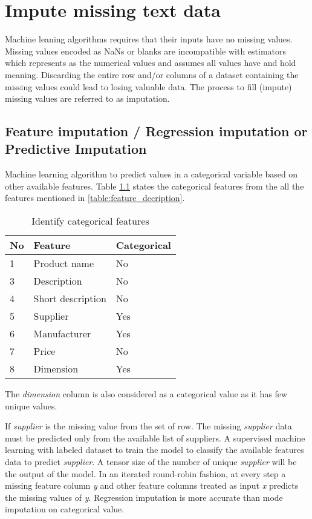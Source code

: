 \chapter{Impute missing text data}

Machine leaning algorithms requires that their inputs have no missing values.
Missing values encoded as NaNs or blanks are incompatible with estimators which represents as the numerical values and assumes all values have and hold meaning. Discarding the entire row and/or columns of a dataset containing the missing values could lead to losing valuable data. The process to fill (impute) missing values are referred to as imputation.

\section{Feature imputation / Regression imputation or \\ Predictive Imputation}

Machine learning algorithm to predict values in a categorical variable based on other available features. Table \ref{table:feature_imputation} states the categorical features from the all the features mentioned in \ref{table:feature_decription}.


\begin{table}[h]
    \centering
    \caption{Identify categorical features}
    \label{table:feature_imputation}
    \begin{tabular}{ lll }
          \toprule
          
          \textbf{No}& \textbf{Feature} & \textbf{Categorical}\\
          \midrule
          1&Product name & No\\
          3&Description & No\\         
          4&Short description  & No\\
          5&Supplier  & Yes\\
          6&Manufacturer  &  Yes\\           
          7&Price  &  No \\
          8&Dimension  & Yes\\
          \bottomrule
          \end{tabular}
\end{table}

The \textit{dimension} column is also considered as a categorical value as it has few unique values.

If \textit{supplier} is the missing value from the set of row. The missing \textit{supplier} data must be predicted only from the available list of suppliers. A supervised machine learning with labeled dataset to train the model to classify the available features data to predict \textit{supplier}. A tensor size of the number of unique \textit{supplier} will be the output of the model. 
In an iterated round-robin fashion, at every step a missing feature column  \textit{y} and other feature columns treated as input \textit{x} predicts the missing values of \textit{y}. Regression imputation is more accurate than mode imputation on categorical value.


